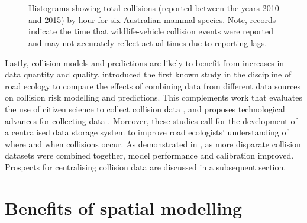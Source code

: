 \begin{figure*}[!t]
  \centering
	\begin{minipage}[t]{.9\textwidth}
    	\centering
    	\hspace{.05\textwidth}
    	\\ 
    	\hspace{.05\textwidth}
    	\\
    	\hspace{.05\textwidth}
    \end{minipage}
  \caption[Total collisions by hour for six mammal species]{Histograms showing total collisions (reported between the years 2010 and 2015) by hour for six Australian mammal species. Note, records indicate the time that wildlife-vehicle collision events were reported and may not accurately reflect actual times due to reporting lags.}
  \label{temporal_all}
\end{figure*}

Lastly, collision models and predictions are likely to benefit from increases in data quantity and quality.  introduced the first known study in the discipline of road ecology to compare the effects of combining data from different data sources on collision risk modelling and predictions. This complements work that evaluates the use of citizen science to collect collision data \citep{paul14, dwye16}, and proposes technological advances for collecting data \citep{olso14}. Moreover, these studies call for the development of a centralised data storage system to improve road ecologists' understanding of where and when collisions occur. As demonstrated in , as more disparate collision datasets were combined together, model performance and calibration improved. Prospects for centralising collision data are discussed in a subsequent section. 

\section{Benefits of spatial modelling}

